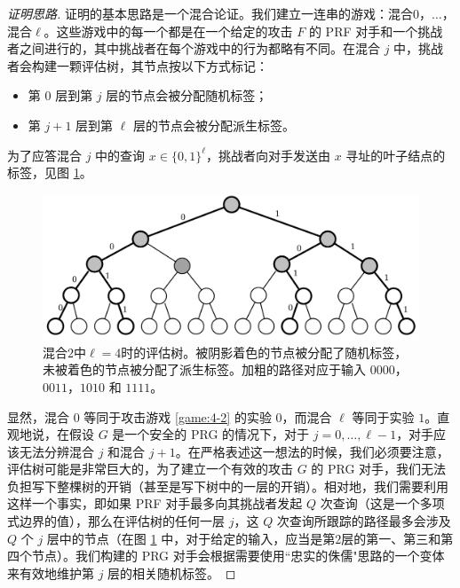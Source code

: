 \begin{proof}[证明思路]
证明的基本思路是一个混合论证。我们建立一连串的游戏：混合$0$，$\dots$，混合$\ell$。这些游戏中的每一个都是在一个给定的攻击 $F$ 的 PRF 对手和一个挑战者之间进行的，其中挑战者在每个游戏中的行为都略有不同。在混合 $j$ 中，挑战者会构建一颗评估树，其节点按以下方式标记：
\begin{itemize}
	\item 第 $0$ 层到第 $j$ 层的节点会被分配随机标签；
	\item 第 $j+1$ 层到第 $\ell$ 层的节点会被分配派生标签。
\end{itemize}
为了应答混合 $j$ 中的查询 $x\in\{0,1\}^\ell$，挑战者向对手发送由 $x$ 寻址的叶子结点的标签，见图 \ref{fig:4-16}。

\begin{figure}
  \centering
  \includegraphics[width=0.75\linewidth]{figures/chapter4/fig16.png}
  \caption{混合$2$中$\ell=4$时的评估树。被阴影着色的节点被分配了随机标签，未被着色的节点被分配了派生标签。加粗的路径对应于输入 $0000$，$0011$，$1010$ 和 $1111$。}
  \label{fig:4-16}
\end{figure}

显然，混合 $0$ 等同于攻击游戏 \ref{game:4-2} 的实验 $0$，而混合 $\ell$ 等同于实验 $1$。直观地说，在假设 $G$ 是一个安全的 PRG 的情况下，对于 $j=0,\dots,\ell-1$，对手应该无法分辨混合 $j$ 和混合 $j+1$。在严格表述这一想法的时候，我们必须要注意，评估树可能是非常巨大的，为了建立一个有效的攻击 $G$ 的 PRG 对手，我们无法负担写下整棵树的开销（甚至是写下树中的一层的开销）。相对地，我们需要利用这样一个事实，即如果 PRF 对手最多向其挑战者发起 $Q$ 次查询（这是一个多项式边界的值），那么在评估树的任何一层 $j$，这 $Q$ 次查询所跟踪的路径最多会涉及 $Q$ 个 $j$ 层中的节点（在图 \ref{fig:4-16} 中，对于给定的输入，应当是第$2$层的第一、第三和第四个节点）。我们构建的 PRG 对手会根据需要使用``忠实的侏儒"思路的一个变体来有效地维护第 $j$ 层的相关随机标签。
\end{proof}

